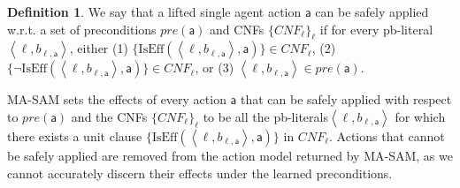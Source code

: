 \documentclass[letterpaper]{article} %
\newcommand{\pre}{\textit{pre}}
\theoremstyle{definition}
\newtheorem{definition}{Definition}
\theoremstyle{remark}
\newcommand{\tuple}[1]{\ensuremath{\left \langle #1 \right \rangle }}
\newcommand{\lifted}{\textit{lifted}}
\newcommand{\cnf}{\textit{CNF}}
\newcommand{\liftl}{\ensuremath{\ell}}
\newcommand{\lifta}{\mathsf{a}}
\newcommand{\iseff}{\text{IsEff}}
\newcommand{\masam}{\ac{MA-SAM}\xspace}
\newcommand{\pbl}{pb-literal\xspace}
\newcommand{\pbls}{pb-literals\xspace}
\newcommand{\roni}[1]{{\textcolor{red}{[Roni: #1]}}}
\newcommand{\brendan}[1]{{\textcolor{orange}{[Brendan: #1]}}}
\begin{document}
\begin{definition}\label{def:lemma-legal-actions}
We say that a lifted single agent action $\lifta$ can be safely applied 
w.r.t. a set of preconditions $\pre(\lifta)$ and CNFs $\{\cnf_\liftl\}_\liftl$
if for every \pbl $\tuple{\liftl,b_{\liftl,\lifta}}$, either 
(1) $\{\iseff(\tuple{\liftl,b_{\liftl,\lifta}}, \lifta)\} \in CNF_\liftl$, 
(2) $\{\neg\iseff(\tuple{\liftl,b_{\liftl,\lifta}}, \lifta)\} \in CNF_\liftl$, or
(3) $\tuple{\liftl,b_{\liftl,\lifta}}\in\pre(\lifta)$.
\end{definition} %
\masam sets the effects of every action $\lifta$ that can be safely applied with respect to $\pre(\lifta)$ and the CNFs $\{CNF_\liftl\}_\liftl$ to be all the \pbls $\tuple{\liftl,b_{\liftl,\lifta}}$ for which there exists a unit clause $\{\iseff(\tuple{\liftl,b_{\liftl,\lifta}},\lifta)\}$ in $CNF_\liftl$. 
Actions that cannot be safely applied are removed from the action model returned by \masam, as we cannot accurately discern their effects under the learned preconditions. 
\end{document}
